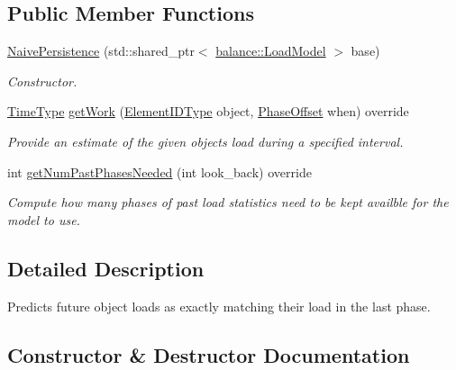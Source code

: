 \subsection*{Public Member Functions}
\begin{DoxyCompactItemize}
\item 
\hyperlink{structvt_1_1vrt_1_1collection_1_1balance_1_1_naive_persistence_a7eb9921b30fbf64f3c2dbbe5a8cce396}{Naive\+Persistence} (std\+::shared\+\_\+ptr$<$ \hyperlink{classvt_1_1vrt_1_1collection_1_1balance_1_1_load_model}{balance\+::\+Load\+Model} $>$ base)
\begin{DoxyCompactList}\small\item\em Constructor. \end{DoxyCompactList}\item 
\hyperlink{namespacevt_a876a9d0cd5a952859c72de8a46881442}{Time\+Type} \hyperlink{structvt_1_1vrt_1_1collection_1_1balance_1_1_naive_persistence_a1cea196b4ca24d5bad5f350f0adcd721}{get\+Work} (\hyperlink{namespacevt_1_1vrt_1_1collection_1_1balance_a14c8d2c972f2913aa3f1636e5be0a120}{Element\+I\+D\+Type} object, \hyperlink{structvt_1_1vrt_1_1collection_1_1balance_1_1_phase_offset}{Phase\+Offset} when) override
\begin{DoxyCompactList}\small\item\em Provide an estimate of the given object\textquotesingle{}s load during a specified interval. \end{DoxyCompactList}\item 
int \hyperlink{structvt_1_1vrt_1_1collection_1_1balance_1_1_naive_persistence_abf20213225a6a25ed7cf119c7a86d834}{get\+Num\+Past\+Phases\+Needed} (int look\+\_\+back) override
\begin{DoxyCompactList}\small\item\em Compute how many phases of past load statistics need to be kept availble for the model to use. \end{DoxyCompactList}\end{DoxyCompactItemize}


\subsection{Detailed Description}
Predicts future object loads as exactly matching their load in the last phase. 

\subsection{Constructor \& Destructor Documentation}
\mbox{\label{structvt_1_1vrt_1_1collection_1_1balance_1_1_naive_persistence_a7eb9921b30fbf64f3c2dbbe5a8cce396}} 
